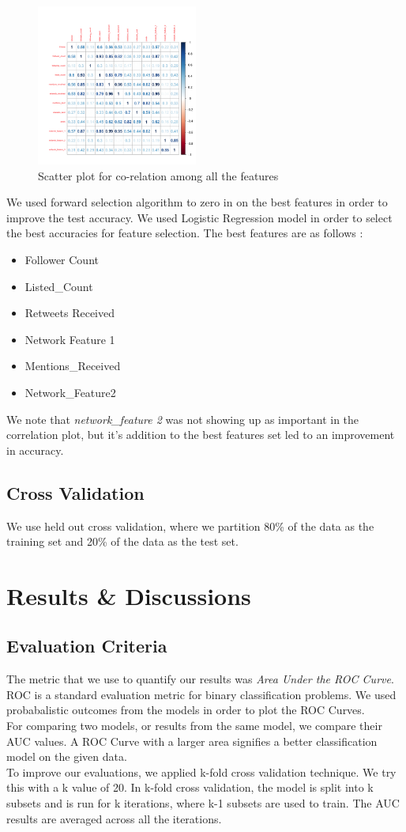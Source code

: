 \documentclass[conference]{IEEEtran}
\numberwithin{equation}{section}
\numberwithin{figure}{section}
\numberwithin{table}{section}
\begin{document}
\begin{figure}
\centering
  \includegraphics[width=200px, height = 200px]{scatter_plt}
  \caption{Scatter plot for co-relation among all the features }
  \label{fs_fig}
\end{figure}
We used forward selection algorithm to zero in on the best features in order to improve the test accuracy. We used Logistic Regression model in order to select the best accuracies for feature selection. The best features are as follows :
\begin{itemize}
\item Follower Count
\item Listed\_Count
\item Retweets Received
\item Network Feature 1
\item Mentions\_Received
\item Network\_Feature2
\end{itemize}

We note that \textit{network\_feature 2} was not showing up as important in the correlation plot, but it's addition to the best features set led to an improvement in accuracy.

\subsection{Cross Validation}
We use held out cross validation, where we partition 80\% of the data as the training set and 20\% of the data as the test set. 

\section{Results \& Discussions}
\subsection{Evaluation Criteria}
The metric that we use to quantify our results was \textit{Area Under the ROC Curve}. ROC is a standard evaluation metric for binary classification problems. We used probabalistic outcomes from the models in order to plot the ROC Curves. \\
For comparing two models, or results from the same model, we compare their AUC values. A ROC Curve with a larger area signifies a better classification model on the given data.\\
To improve our evaluations, we applied k-fold cross validation technique. We try this with a k value of 20. In k-fold cross validation, the model is split into k subsets and is run for k iterations, where k-1 subsets are used to train. The AUC results are averaged across all the iterations.
\end{document}
